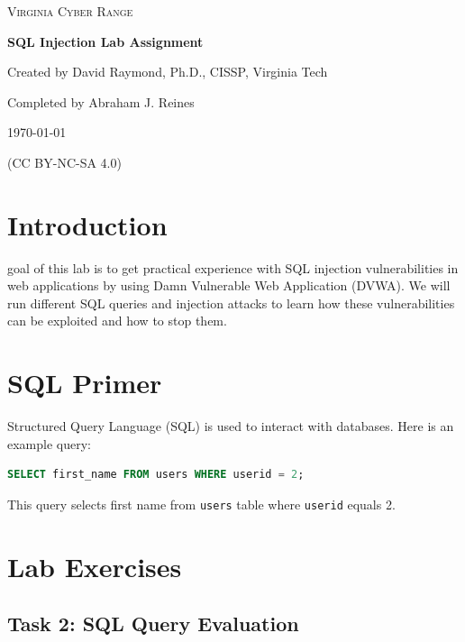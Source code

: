 \documentclass[12pt]{article}
\begin{document}
\begin{titlepage}
    \centering
    {\scshape\LARGE Virginia Cyber Range \par}
    \vspace{1cm}
    {\huge\bfseries SQL Injection Lab Assignment\par}
    \vspace{1.5cm}
    {\Large Created by David Raymond, Ph.D., CISSP, Virginia Tech\par}
    \vspace{2cm}
    {\Large Completed by Abraham J. Reines\par}
    \vspace{2cm}
    {\Large \today\par}
    \vfill
    {\small (CC BY-NC-SA 4.0)}
\end{titlepage}

\tableofcontents
\newpage

\section{Introduction}

goal of this lab is to get practical experience with SQL injection vulnerabilities in web applications by using Damn Vulnerable Web Application (DVWA). We will run different SQL queries and injection attacks to learn how these vulnerabilities can be exploited and how to stop them.

\section{SQL Primer}

Structured Query Language (SQL) is used to interact with databases. Here is an example query:

\begin{lstlisting}[language=SQL]
SELECT first_name FROM users WHERE userid = 2;
\end{lstlisting}

This query selects first name from \texttt{users} table where \texttt{userid} equals 2.

\section{Lab Exercises}

\subsection{Task 2: SQL Query Evaluation}
\end{document}
